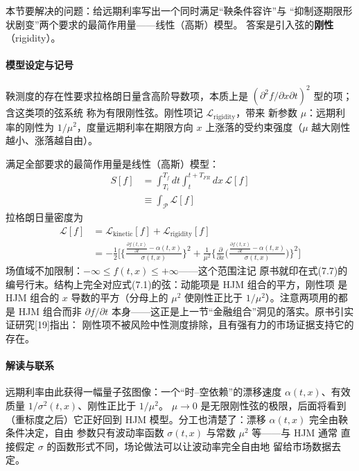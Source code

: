 本节要解决的问题：给远期利率写出一个同时满足“鞅条件容许”与
“抑制逐期限形状剧变”两个要求的最简作用量——线性（高斯）模型。
答案是引入弦的\textbf{刚性}（rigidity）。

\paragraph{模型设定与记号}
鞅测度的存在性要求拉格朗日量含高阶导数项，本质上是
$(\partial^2f/\partial x\partial t)^2$ 型的项；含这类项的弦系统
称为有限刚性弦。刚性项记 $\mathcal{L}_{\mathrm{rigidity}}$，带来
新参数 $\mu$：远期利率的刚性为 $1/\mu^2$，度量远期利率在期限方向
$x$ 上涨落的受约束强度（$\mu$ 越大刚性越小、涨落越自由）。

满足全部要求的最简作用量是线性（高斯）模型：
\begin{align*}
S[f]&=\int_{T_i}^{T_f}dt\int_{t}^{t+T_{FR}}dx\,\mathcal{L}[f]
\tag{7.4}\\
&\equiv\int_{\mathcal{P}}\mathcal{L}[f]
\tag{7.5}
\end{align*}
拉格朗日量密度为
\begin{align*}
\mathcal{L}[f]&=\mathcal{L}_{\mathrm{kinetic}}[f]
+\mathcal{L}_{\mathrm{rigidity}}[f]
\tag{7.6}\\
&=-\frac{1}{2}\Biggl[\biggl\{\frac{\frac{\partial f(t,x)}{\partial t}
-\alpha(t,x)}{\sigma(t,x)}\biggr\}^{2}
+\frac{1}{\mu^{2}}\biggl\{\frac{\partial}{\partial x}
\biggl(\frac{\frac{\partial f(t,x)}{\partial t}-\alpha(t,x)}
{\sigma(t,x)}\biggr)\biggr\}^{2}\Biggr]
\tag{7.7}
\end{align*}
场值域不加限制：$-\infty\leq f(t,x)\leq+\infty$——这个范围注记
原书就印在式(7.7)的编号行末。结构上完全对应式(7.1)的弦：动能项是
HJM 组合的平方，刚性项
是 HJM 组合的 $x$ 导数的平方（分母上的 $\mu^2$ 使刚性正比于
$1/\mu^2$）。注意两项用的都是 HJM 组合而非 $\partial f/\partial t$
本身——这正是上一节“金融组合”洞见的落实。原书引实证研究[19]指出：
刚性项不被风险中性测度排除，且有强有力的市场证据支持它的存在。

\paragraph{解读与联系}
远期利率由此获得一幅量子弦图像：一个“时--空依赖”的漂移速度
$\alpha(t,x)$、有效质量 $1/\sigma^2(t,x)$、刚性正比于 $1/\mu^2$。
$\mu\to0$ 是无限刚性弦的极限，后面将看到（重标度之后）它正好回到
HJM 模型。分工也清楚了：漂移 $\alpha(t,x)$ 完全由鞅条件决定，自由
参数只有波动率函数 $\sigma(t,x)$ 与常数 $\mu^2$ 等——与 HJM 通常
直接假定 $\sigma$ 的函数形式不同，场论做法可以让波动率完全自由地
留给市场数据去定。

